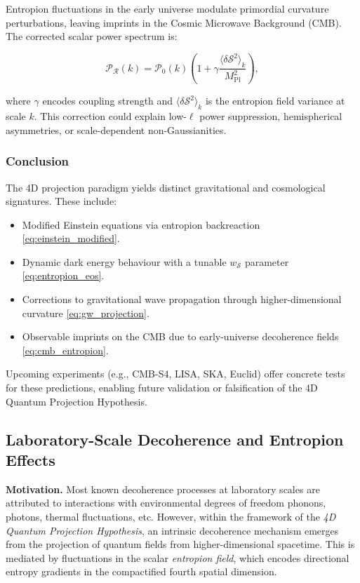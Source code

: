 \documentclass[12pt]{article}
\begin{document}
Entropion fluctuations in the early universe modulate primordial curvature perturbations, leaving imprints in the Cosmic Microwave Background (CMB). The corrected scalar power spectrum is:

\begin{equation}
\mathcal{P}_{\mathcal{R}}(k) = \mathcal{P}_0(k) \left(1 + \gamma \frac{\langle \delta \mathcal{S}^2 \rangle_k}{M_{\text{Pl}}^2} \right),
\label{eq:cmb_entropion}
\end{equation}

where $\gamma$ encodes coupling strength and $\langle \delta \mathcal{S}^2 \rangle_k$ is the entropion field variance at scale $k$. This correction could explain low-$\ell$ power suppression, hemispherical asymmetries, or scale-dependent non-Gaussianities.

\subsubsection*{Conclusion}

The 4D projection paradigm yields distinct gravitational and cosmological signatures. These include:
\begin{itemize}
  \item Modified Einstein equations via entropion backreaction \eqref{eq:einstein_modified}.
  \item Dynamic dark energy behaviour with a tunable $w_{\mathcal{S}}$ parameter \eqref{eq:entropion_eos}.
  \item Corrections to gravitational wave propagation through higher-dimensional curvature \eqref{eq:gw_projection}.
  \item Observable imprints on the CMB due to early-universe decoherence fields \eqref{eq:cmb_entropion}.
\end{itemize}

Upcoming experiments (e.g., CMB-S4, LISA, SKA, Euclid) offer concrete tests for these predictions, enabling future validation or falsification of the 4D Quantum Projection Hypothesis.


\subsection{Laboratory-Scale Decoherence and Entropion Effects}

\textbf{Motivation.} Most known decoherence processes at laboratory scales are attributed to interactions with environmental degrees of freedom phonons, photons, thermal fluctuations, etc. However, within the framework of the \emph{4D Quantum Projection Hypothesis}, an intrinsic decoherence mechanism emerges from the projection of quantum fields from higher-dimensional spacetime. This is mediated by fluctuations in the scalar \emph{entropion field}, which encodes directional entropy gradients in the compactified fourth spatial dimension.
\end{document}
